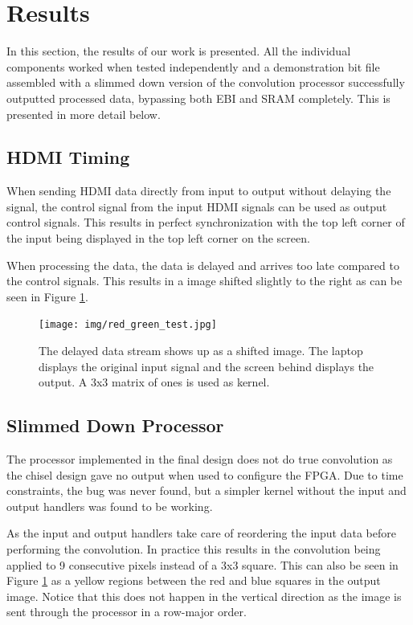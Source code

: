 \section{Results}

In this section, the results of our work is presented.
All the individual components worked when tested independently and a demonstration bit file assembled with a slimmed down version of the convolution processor successfully outputted processed data, bypassing both EBI and SRAM completely.
This is presented in more detail below.

\subsection{HDMI Timing}
When sending HDMI data directly from input to output without delaying the signal, the control signal from the input HDMI signals can be used as output control signals.
This results in perfect synchronization with the top left corner of the input being displayed in the top left corner on the screen.

When processing the data, the data is delayed and arrives too late compared to the control signals. This results in a image shifted slightly to the right as can be seen in Figure \ref{fig:SyncDelay}.

\begin{figure}
    \centering
    \texttt{[image: img/red\_green\_test.jpg]}
    \caption[The delayed data stream.]{
        The delayed data stream shows up as a shifted image.
        The laptop displays the original input signal and the screen behind displays the output.
        A 3x3 matrix of ones is used as kernel.
    }
    \label{fig:SyncDelay}
\end{figure}

\subsection{Slimmed Down Processor}
The processor implemented in the final design does not do true convolution as the chisel design gave no output when used to configure the FPGA.
Due to time constraints, the bug was never found, but a simpler kernel without the input and output handlers was found to be working.

As the input and output handlers take care of reordering the input data before performing the convolution.
In practice this results in the convolution being applied to 9 consecutive pixels instead of a 3x3 square.
This can also be seen in Figure \ref{fig:SyncDelay} as a yellow regions between the red and blue squares in the output image.
Notice that this does not happen in the vertical direction as the image is sent through the processor in a row-major order.

